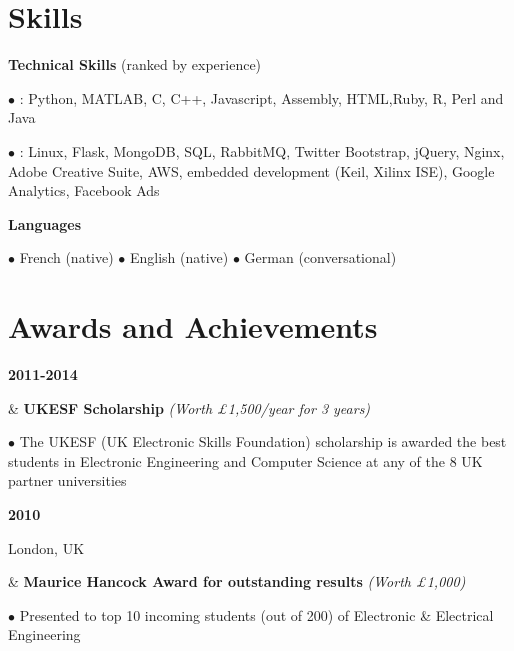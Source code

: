 \documentclass[a4paper,10pt,oneside]{article}
\begin{document}
\section*{Skills}


\begin{flushleft}
	\vspace{-0.8em}
	
	
	\hspace{1em} \textbf{Technical Skills} (ranked by experience)
	
	\hspace{2em} $\bullet$ \underline{}: Python, MATLAB, C, C++, Javascript, Assembly, HTML,Ruby, R, Perl and Java
	
	\hspace{2em} \parbox{0.95\textwidth}{$\bullet$ \underline{}: Linux, Flask, MongoDB, SQL, RabbitMQ, Twitter Bootstrap, jQuery, Nginx, Adobe Creative Suite, AWS, embedded  development (Keil, Xilinx ISE), Google Analytics, Facebook Ads}
	
	\hspace{1em} \textbf{Languages}
	
	\hspace{2em} $\bullet$ French (native) $\bullet$ English (native) $\bullet$ German (conversational)
	
\end{flushleft}

\section*{Awards and Achievements}

\begin{body}
{\textbf{2011-2014} \par {}} & \textbf{UKESF Scholarship} \textit{(Worth £1,500/year for 3 years)}

$\bullet$ The UKESF (UK Electronic Skills Foundation) scholarship is awarded the best students in Electronic Engineering and Computer Science at any of the 8 UK partner universities
\\
{\textbf{2010} \par London, UK} & \textbf{Maurice Hancock Award for outstanding results} \textit{(Worth £1,000)}

$\bullet$ Presented to top 10 incoming students (out of 200) of Electronic \& Electrical Engineering

\end{body}
\end{document}
